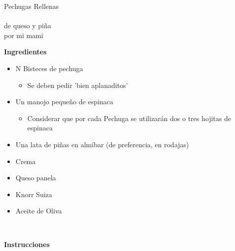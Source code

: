 \documentclass[letterpaper]{article}
\begin{document}
\begin{center}
{\Huge Pechugas Rellenas}\\\\

{\huge de queso y piña}\\

por mi mami\\
\end{center}

\hrulefill
\begin{center}
\textbf{\Large Ingredientes}\\
\end{center}
\hrulefill


\begin{itemize}
\item N Bisteces de pechuga
	\begin{itemize}
		\item Se deben pedir 'bien aplanaditos'
	\end{itemize}
\item Un manojo pequeño de espinaca
	\begin{itemize}
		\item Considerar que por cada Pechuga se utilizarán dos o tres hojitas de espinaca
	\end{itemize}
\item Una lata de piñas en almíbar (de preferencia, en rodajas)
\item Crema 
\item Queso panela
\item Knorr Suiza
\item Aceite de Oliva
\end{itemize}

\hrulefill \\
\begin{center}
\textbf{\Large Instrucciones}
\end{center}
\hrulefill
\end{document}
